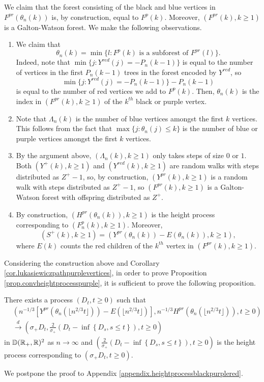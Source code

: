 We claim that the forest consisting of the black and blue vertices in $F^{pr}(\theta_n(k))$ is, by construction, equal to $F^{p}(k)$. Moreover, $(F^{pr}(k),k\geq 1)$ is a Galton-Watson forest. We make the following observations.
\begin{enumerate}
    \item We claim that $$\theta_n(k)=\min\{l: F^p(k)\text{ is a subforest of }F^{pr}(l)\}.$$ Indeed, note that $\min\{j: Y^{red}(j)=-P_n(k-1)\}$ is equal to the number of vertices in the first $P_n(k-1)$ trees in the forest encoded by $Y^{red}$, so $$\min\{j: Y^{red}(j)=-P_n(k-1)\}-P_n(k-1)$$ is equal to the number of red vertices we add to $F^p(k)$. Then, $\theta_n(k)$ is the index in $(F^{pr}(k),k\geq 1)$ of the $k^{th}$ black or purple vertex. 
    \item Note that $\Lambda_n(k)$ is the number of blue vertices amongst the first $k$ vertices. This follows from the fact that $\max\{j:\theta_n(j)\leq k\}$ is the number of blue or purple vertices amongst the first $k$ vertices. 
    \item By the argument above, $(\Lambda_n(k),k\geq 1)$ only takes steps of size $0$ or $1$. Both $(Y^+(k),k\geq 1)$ and $(Y^{red}(k),k\geq 1)$ are random walks with steps distributed as $Z^+-1$, so, by construction, $(Y^{pr}(k),k\geq 1)$ is a random walk with steps distributed as $Z^+-1$, so $(F^{pr}(k),k\geq 1)$ is a Galton-Watson forest with offspring distributed as $Z^+$.
    \item By construction, $(H^{pr}(\theta_n(k)),k\geq 1)$ is the height process corresponding to $(F^p_n(k),k\geq 1)$. Moreover,
   \begin{equation}\label{eq.constructionSp}(S^{+}(k),k\geq 1)=(Y^{pr}(\theta_n(k))-E(\theta_n(k)),k\geq 1),\end{equation}
    where 
    $E(k)$ counts the red children of the $k^{th}$ vertex in $(F^{pr}(k),k\geq 1)$.
\end{enumerate}
Considering the construction above and Corollary \ref{cor.lukasiewiczpathpurplevertices}, in order to prove Proposition \ref{prop.convheightprocesspurple}, it is sufficient to prove the following proposition.
\begin{proposition}\label{prop.heightprocessblackpurplered}
There exists a process $(D_t,t\geq 0)$ such that 
\begin{align*}
    &\left(n^{-1/3}\left[Y^{pr}\left(\theta_n\left(\lfloor n^{2/3}t\rfloor \right)\right)-E\left(\lfloor n^{2/3}t\rfloor \right)\right], n^{-1/3}H^{pr}\left(\theta_n\left(\lfloor n^{2/3}t\rfloor \right)\right),t\geq 0\right)\\
    &\overset{d}{\to}\left(\sigma_+D_t,\frac{2}{\sigma_+}\left(D_t-\inf\left\{D_s,s\leq t\right\}\right),t\geq 0\right)
\end{align*}
in ${\mathbb D}({\mathbb R}_+,{\mathbb R})^2$ as $n\to \infty$ and $\left(\frac{2}{\sigma_+}\left(D_t-\inf\left\{D_s,s\leq t\right\}\right),t\geq 0\right)$ is the height process corresponding to $(\sigma_+D_t,t\geq 0)$.
\end{proposition} 
We postpone the proof to Appendix \ref{appendix.heightprocessblackpurplered}. 

